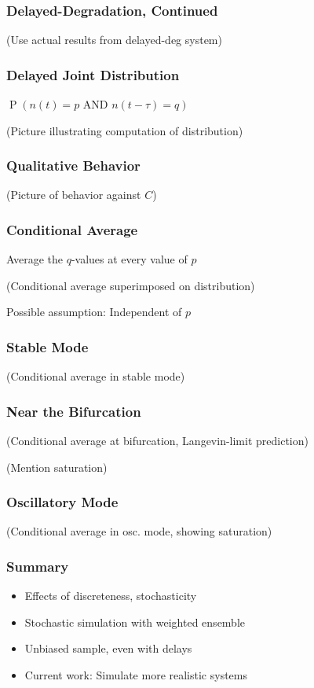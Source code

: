 \documentclass[xcolor={usenames,dvipsnames,svgnames}]{beamer}
\DeclareMathOperator{\Prob}{P}
\begin{document}
\begin{frame}
    \frametitle{Delayed-Degradation, Continued}
    (Use actual results from delayed-deg system)
    \begin{center}
        \resizebox{0.48\textwidth}{!}{
            
        }
        \resizebox{0.48\textwidth}{!}{
            
        }
    \end{center}
\end{frame}

\begin{frame}
    \frametitle{Delayed Joint Distribution}

    $\Prob \left(n(t) = p \text{ AND } n(t - \tau) = q \right)$

    (Picture illustrating computation of distribution)
\end{frame}

\begin{frame}
    \frametitle{Qualitative Behavior}

    (Picture of behavior against $C$)
\end{frame}

\begin{frame}
    \frametitle{Conditional Average}

    Average the $q$-values at every value of $p$

    (Conditional average superimposed on distribution)

    Possible assumption: Independent of $p$
\end{frame}

\begin{frame}
    \frametitle{Stable Mode}

    (Conditional average in stable mode)
\end{frame}

\begin{frame}
    \frametitle{Near the Bifurcation}

    (Conditional average at bifurcation, Langevin-limit prediction)

    (Mention saturation)
\end{frame}

\begin{frame}
    \frametitle{Oscillatory Mode}

    (Conditional average in osc. mode, showing saturation)
\end{frame}

\begin{frame}
    \frametitle{Summary}
    \begin{itemize}
        \item Effects of discreteness, stochasticity
        \item Stochastic simulation with weighted ensemble
        \item Unbiased sample, even with delays
        \item Current work: Simulate more realistic systems
    \end{itemize}
\end{frame}
\end{document}
